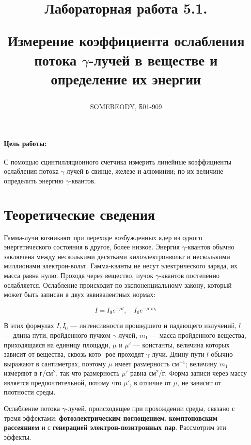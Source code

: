 \documentclass[a5paper, 10pt, twoside]{article} %
\title
{\hfill \break  \hfill \break
\hfill \break  \hfill \break
Лабораторная работа 5.1.

Измерение коэффициента ослабления потока $\gamma$-лучей в веществе и определение
их энергии}
\author{SOMEBEODY, Б01-909}
\begin{document}
\maketitle


\thispagestyle{empty} %

\newpage

\tableofcontents %
\thispagestyle{plain}
\newpage


\paragraph{Цель работы:}

С помощью сцинтилляционного счетчика измерить линейные коэффициенты ослабления
потока $\gamma$-лучей в свинце, железе и алюминии; по их величине определить
энергию $\gamma$-квантов.

\section{Теоретические сведения}

Гамма-лучи возникают при переходе возбужденных ядер из одного энергетического
состояния в другое, более низкое. Энергия $ \gamma $-квантов обычно заключена
между несколькими десятками килоэлектронвольт и несколькими миллионами
электрон-вольт. Гамма-кванты не несут электрического заряда, их масса равна
нулю. Проходя через вещество, пучок $ \gamma $-квантов постепенно ослабляется.
Ослабление происходит по экспоненциальному закону, который может быть записан в
двух эквивалентных нормах:

\begin{equation}\label{I(mu)}
I = I_0 e^{-\mu l}, \quad I_0 e^{-\mu 'm_1}
\end{equation}

В этих формулах $ I, I_0 $ --- интенсивности прошедшего и падающего излучений, $
l $ --- длина пути, пройденного пучком $\gamma$-лучей, $ m_1 $ --- масса
пройденного вещества, приходящаяся на единицу площади, $ \mu $ и $ \mu' $ ---
константы, величина которых зависит от вещества, сквозь кото- рое проходят
$\gamma$-лучи. Длину пути $ l $ обычно выражают в сантиметрах, поэтому $ \mu $
имеет размерность см$ ^{-1} $; величину $ m_1 $ измеряют в г/см$ ^2 $, так что
размерность $ \mu' $ равна см$ ^2 $/г. Форма записи через массу является
предпочтительной, потому что $ \mu' $, в отличие от $ \mu $, не зависит от
плотности среды.

Ослабление потока $\gamma$-лучей, происходящее при прохождении среды, связано с
тремя эффектами: \textbf{фотоэлектрическим поглощением}, \textbf{комптоновским
рассеянием} и с \textbf{генерацией электрон-позитронных пар}. Рассмотрим эти
эффекты.
\end{document}
